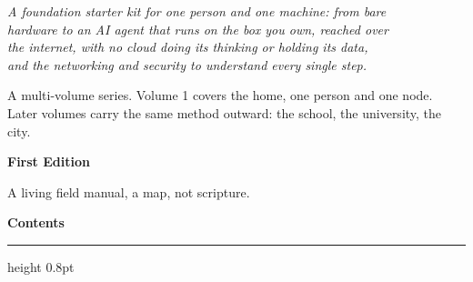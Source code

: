 \begin{titlepage}
\vspace{26pt minus 10pt}

{\itshape\normalsize\color{softblack!75}
A foundation starter kit for one person and one machine: from bare\\
hardware to an AI agent that runs on the box you own, reached over\\
the internet, with no cloud doing its thinking or holding its data,\\
and the networking and security to understand every single step.\par}

\vfill

{\sffamily\footnotesize\color{softblack!60}
A multi-volume series. Volume 1 covers the home, one person and one node.\\
Later volumes carry the same method outward: the school, the university, the city.\par}
\vspace{16pt minus 6pt}
{\sffamily\small\color{accentlt}\textbf{First Edition}\par}
\vspace{4pt minus 1pt}
{\sffamily\footnotesize\color{softblack!55} A living field manual, a map, not scripture.\par}
\vspace{1.0cm minus 0.7cm}
\end{titlepage}

\clearpage
\thispagestyle{plain}
{\sffamily\Large\bfseries\color{accent}Contents\par}\vspace{6pt}
{\color{rulegray}\hrule height 0.8pt}\vspace{10pt}
\makeatletter
{}
\makeatother
\clearpage
